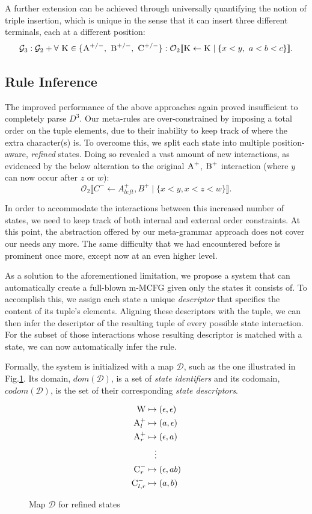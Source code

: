 \documentclass{llncs}
\newcommand\s{\textsc}
\newcommand{\Orderr}[5]{
	\mathcal{#1}_{#5}\llbracket #2 \leftarrow #3 \mid \{ #4 \} \rrbracket.
}
\newcommand{\Or}[4]{\Orderr{O}{#1}{#2}{#3}{#4}}
\begin{document}
A further extension can be achieved through universally quantifying the notion of triple insertion, which is unique in the sense that it can insert three different terminals, each at a different position:
\[
\mathcal{G}_3: \mathcal{G}_2 + \forall \ \s{K} \in \{\textsc{A}^{+/-},\ \textsc{B}^{+/-},\ \textsc{C}^{+/-}\}: \Or{\s{K}}{\s{K}}{x < y,\ a < b < c}{2}
\]

\subsection{Rule Inference}\label{aris}	
The improved performance of the above approaches again proved insufficient to completely parse $D^3$. Our meta-rules are over-constrained by imposing a total order on the tuple elements, due to their inability to keep track of where the extra character(s) is. To overcome this, we split each state into multiple position-aware, \textit{refined} states. Doing so revealed a vast amount of new interactions, as evidenced by the below alteration to the original $\s{A}^+$, $\s{B}^+$ interaction (where $y$ can now occur after $z$ or $w$):
\[
\Or{C^-}{A^+_{left}, B^+}{x < y, x < z < w}{2}
\]

In order to accommodate the interactions between this increased number of states, we need to keep track of both internal and external order constraints. At this point, the abstraction offered by our meta-grammar approach does not cover our needs any more. The same difficulty that we had encountered before is prominent once more, except now at an even higher level. 

As a solution to the aforementioned limitation, we propose a system that can automatically create a full-blown m-MCFG given only the states it consists of. To accomplish this, we assign each state a unique \textit{descriptor} that specifies the content of its tuple's elements. Aligning these descriptors with the tuple, we can then infer the descriptor of the resulting tuple of every possible state interaction. For the subset of those interactions whose resulting descriptor is matched with a state, we can now automatically infer the rule.

Formally, the system is initialized with a map $\mathcal{D}$, such as the one illustrated in Fig.\ref{fig:desc}. Its domain, $dom(\mathcal{D})$, is a set of \textit{state identifiers} and its codomain, $codom(\mathcal{D})$, is the set of their corresponding \textit{state descriptors}.

\begin{figure}
\begin{align*}
\s{W} &\mapsto (\epsilon, \epsilon) \\
\s{A}^+_{l} &\mapsto (a, \epsilon) \\
\s{A}^+_{r} &\mapsto (\epsilon, a) \\
&\quad \vdots \\
\s{C}^-_{r} &\mapsto (\epsilon, ab) \\
\s{C}^-_{l, r} &\mapsto (a, b)
\end{align*}
\caption{Map $\mathcal{D}$ for refined states}
\label{fig:desc}
\end{figure}
\end{document}
